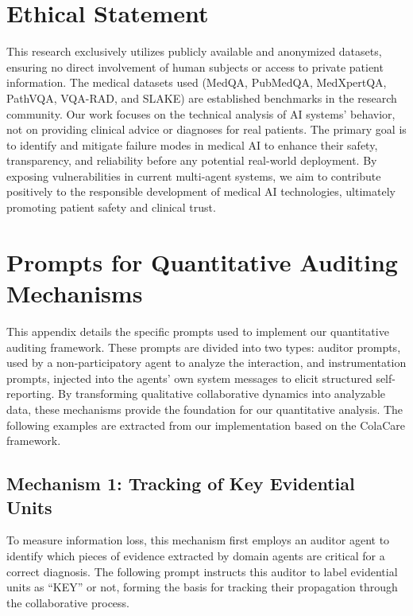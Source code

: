 \appendix

\section{Ethical Statement}
\label{sec:appendix_ethics}
This research exclusively utilizes publicly available and anonymized datasets, ensuring no direct involvement of human subjects or access to private patient information. The medical datasets used (MedQA, PubMedQA, MedXpertQA, PathVQA, VQA-RAD, and SLAKE) are established benchmarks in the research community. Our work focuses on the technical analysis of AI systems' behavior, not on providing clinical advice or diagnoses for real patients. The primary goal is to identify and mitigate failure modes in medical AI to enhance their safety, transparency, and reliability before any potential real-world deployment. By exposing vulnerabilities in current multi-agent systems, we aim to contribute positively to the responsible development of medical AI technologies, ultimately promoting patient safety and clinical trust.

\section{Prompts for Quantitative Auditing Mechanisms}
\label{sec:appendix_prompts}

This appendix details the specific prompts used to implement our quantitative auditing framework. These prompts are divided into two types: auditor prompts, used by a non-participatory agent to analyze the interaction, and instrumentation prompts, injected into the agents' own system messages to elicit structured self-reporting. By transforming qualitative collaborative dynamics into analyzable data, these mechanisms provide the foundation for our quantitative analysis. The following examples are extracted from our implementation based on the ColaCare framework.

\subsection{Mechanism 1: Tracking of Key Evidential Units}

To measure information loss, this mechanism first employs an auditor agent to identify which pieces of evidence extracted by domain agents are critical for a correct diagnosis. The following prompt instructs this auditor to label evidential units as ``KEY'' or not, forming the basis for tracking their propagation through the collaborative process.

